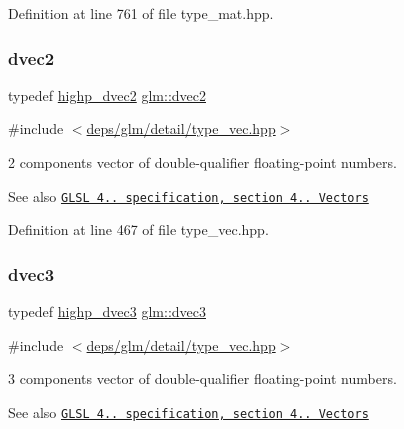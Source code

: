 Definition at line 761 of file type\+\_\+mat.\+hpp.

\mbox{\label{group__core__types_gae6727259898288cae197724d5f172b3b}} 
\subsubsection{\texorpdfstring{dvec2}{dvec2}}
{\footnotesize\ttfamily typedef \hyperlink{group__core__precision_gadec51e8e57b72d8fc95e87f18d1ad4dd}{highp\+\_\+dvec2} \hyperlink{group__core__types_gae6727259898288cae197724d5f172b3b}{glm\+::dvec2}}



{\ttfamily \#include $<$\hyperlink{type__vec_8hpp}{deps/glm/detail/type\+\_\+vec.\+hpp}$>$}

2 components vector of double-\/qualifier floating-\/point numbers.

\begin{DoxySeeAlso}{See also}
\href{http://www.opengl.org/registry/doc/GLSLangSpec.4.20.8.pdf}{\tt G\+L\+SL 4.. specification, section 4.. Vectors} 
\end{DoxySeeAlso}


Definition at line 467 of file type\+\_\+vec.\+hpp.

\mbox{\label{group__core__types_ga7f3287f952e6ccb481231368091702ac}} 
\subsubsection{\texorpdfstring{dvec3}{dvec3}}
{\footnotesize\ttfamily typedef \hyperlink{group__core__precision_ga63f89fa26f599ac15428c9d1a70a5467}{highp\+\_\+dvec3} \hyperlink{group__core__types_ga7f3287f952e6ccb481231368091702ac}{glm\+::dvec3}}



{\ttfamily \#include $<$\hyperlink{type__vec_8hpp}{deps/glm/detail/type\+\_\+vec.\+hpp}$>$}

3 components vector of double-\/qualifier floating-\/point numbers.

\begin{DoxySeeAlso}{See also}
\href{http://www.opengl.org/registry/doc/GLSLangSpec.4.20.8.pdf}{\tt G\+L\+SL 4.. specification, section 4.. Vectors} 
\end{DoxySeeAlso}


